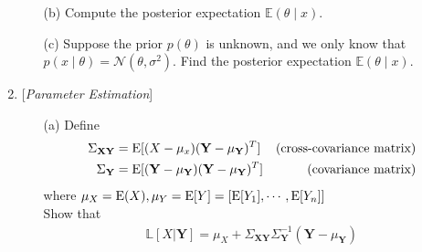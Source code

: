 \documentclass[10pt]{article}
\begin{document}
\begin{enumerate}
\begin{itemize}
	\item[(b)] Compute the posterior expectation $\mathbb{E}(\theta \mid x)$. 
    
	\item[(c)] Suppose the prior $p(\theta)$ is unknown, and we only know that $p(x \mid \theta) = \mathcal{N}(\theta, \sigma^2).$ Find the posterior expectation $\mathbb{E}(\theta \mid x)$. 
\end{itemize}


\newpage{}




\item{} {[}\textit{Parameter Estimation}{]}
\begin{itemize}
In class, we have learned that the MMSE is achieved when using the conditional expectation \(\E[X | \mathbf{Y}]\), i.e., \(\arg\min_{\hat{X}}\E[|X-\hat{X}(\mathbf{Y})|^2] = E[X|\mathbf{Y}]\), where \(X\) is some unknown random variable and \(\mathbf{Y}\) is the observation. However, \(\E[X|\mathbf{Y}]\) can be intractable to compute. Now, let's focus on linear estimation and minimize MSE over all linear estimators.
\begin{definition}[LLSE]
    \[\mathbb{L}[X|\mathbf{Y}] = \arg\min_{\text{linear }\hat{X}}\E[|X-\hat{X}(\mathbf{Y})|^2]\]
\end{definition}
where linear estimators \(\hat{X}(\mathbf{Y})\) are of the form 
\[\hat{X}(\mathbf{Y}) = a+\sum_{i = 1}^nb_iY_i\] for \(a,b_i\in \mathbb{R}\) where \(\mathbf{Y} = (Y_1, \cdots , Y_n)\) is a vector of observations.

\item[(a)] 
Define
\begin{align*}
    \Sigma_{\mathbf{XY}} &= \mathrm{E}[(X-\mu_x)(\mathbf{Y}-\mu_\mathbf{Y})^T]&\text{(cross-covariance matrix)}\\
    \Sigma_{\mathbf{Y}} &= \mathrm{E}[(\mathbf{Y}-\mu_\mathbf{Y})(\mathbf{Y}-\mu_\mathbf{Y})^T]&\text{(covariance matrix)}
\end{align*}
where \(\mu_X=\mathrm{E}(X),\mu_Y= \mathrm{E}[Y] = [\mathrm{E}[Y_1],\cdots,\mathrm{E}[Y_n]]\)\\
Show that 
\begin{align}
    \mathbb{L}[X|\mathbf{Y}] = \mu_X+\Sigma_{\mathbf{XY}}\Sigma_{\mathbf{Y}}^{-1}(\mathbf{Y}-\mu_\mathbf{Y})
\end{align}


\end{itemize}
\end{enumerate}
\end{document}
